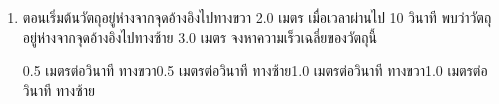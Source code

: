 \begin{enumerate}
	\item  \nonet ตอนเริ่มต้นวัตถุอยู่ห่างจากจุดอ้างอิงไปทางขวา  2.0  เมตร   เมื่อเวลาผ่านไป  10  	วินาที   พบว่าวัตถุอยู่ห่างจากจุดอ้างอิงไปทางซ้าย   3.0  เมตร  จงหาความเร็วเฉลี่ยของวัตถุนี้ \runningj 
	\begin{2c}
		{0.5  เมตรต่อวินาที 	 ทางขวา}{0.5  เมตรต่อวินาที  ทางซ้าย}{1.0  เมตรต่อวินาที 	 ทางขวา}{1.0  เมตรต่อวินาที  ทางซ้าย}
	\end{2c}
\end{enumerate}
